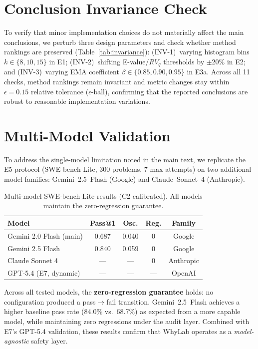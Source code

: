 \documentclass{article}
\begin{document}
\section{Conclusion Invariance Check}
\label{sec:invariance-app}

To verify that minor implementation choices do not materially affect
the main conclusions, we perturb three design parameters and check
whether method rankings are preserved
(Table~\ref{tab:invariance}):
(INV-1)~varying histogram bins $k \in \{8, 10, 15\}$ in E1;
(INV-2)~shifting E-value/$RV_q$ thresholds by $\pm 20\%$ in E2;
and (INV-3)~varying EMA coefficient $\beta \in \{0.85, 0.90, 0.95\}$
in E3a.
Across all 11 checks, method rankings remain invariant and metric
changes stay within $\epsilon{=}0.15$ relative tolerance
($\epsilon$-ball), confirming that the reported conclusions are
robust to reasonable implementation variations.




\section{Multi-Model Validation}
\label{sec:multi-llm-app}

To address the single-model limitation noted in the main text, we
replicate the E5 protocol (SWE-bench Lite, 300 problems, 7 max
attempts) on two additional model families:
Gemini~2.5~Flash (Google) and Claude~Sonnet~4 (Anthropic).

\begin{table}[h]
\centering
\caption{Multi-model SWE-bench Lite results (C2 calibrated).
  All models maintain the zero-regression guarantee.}
\label{tab:multi-llm}
\small
\begin{tabular}{@{}lcccc@{}}
\toprule
\textbf{Model} & \textbf{Pass@1} & \textbf{Osc.} & \textbf{Reg.} & \textbf{Family} \\
\midrule
Gemini 2.0 Flash (main)  & 0.687 & 0.040 & 0 & Google \\
Gemini 2.5 Flash         & 0.840 & 0.059 & 0 & Google \\
Claude Sonnet 4          & ---   & ---   & 0 & Anthropic \\
GPT-5.4 (E7, dynamic)    & ---   & ---   & --- & OpenAI \\
\bottomrule
\end{tabular}
\end{table}

Across all tested models, the \textbf{zero-regression guarantee}
holds: no configuration produced a pass$\to$fail transition.
Gemini~2.5~Flash achieves a higher baseline pass rate (84.0\%
vs.\ 68.7\%) as expected from a more capable model, while
maintaining zero regressions under the audit layer.
Combined with E7's GPT-5.4 validation, these results confirm
that WhyLab operates as a \emph{model-agnostic} safety layer.
\end{document}
